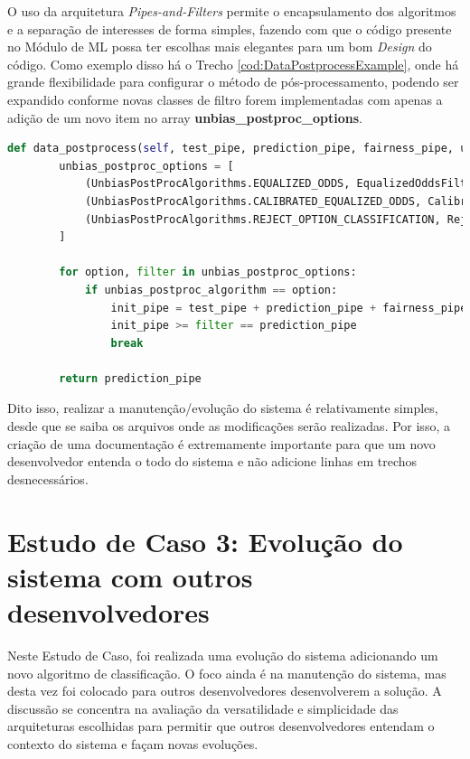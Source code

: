 \documentclass[portugues]{ic-tese}
\begin{document}
O uso da arquitetura \textit{Pipes-and-Filters} permite o encapsulamento dos algoritmos e a separação de interesses de forma simples, fazendo com que o código presente no Módulo de ML possa ter escolhas mais elegantes para um bom \textit{Design} do código. Como exemplo disso há o Trecho \ref{cod:DataPostprocessExample}, onde há grande flexibilidade para configurar o método de pós-processamento, podendo ser expandido conforme novas classes de filtro forem implementadas com apenas a adição de um novo item no array \textbf{unbias\_postproc\_options}.

\begin{lstlisting}[language=Python, caption=Método para seleção de algoritmo para redução de viés de pós-processamento,label=cod:DataPostprocessExample]
    def data_postprocess(self, test_pipe, prediction_pipe, fairness_pipe, unbias_postproc_algorithm):
        unbias_postproc_options = [
            (UnbiasPostProcAlgorithms.EQUALIZED_ODDS, EqualizedOddsFilter()),
            (UnbiasPostProcAlgorithms.CALIBRATED_EQUALIZED_ODDS, CalibratedEqualizedOddsFilter()),
            (UnbiasPostProcAlgorithms.REJECT_OPTION_CLASSIFICATION, RejectOptionClassificationFilter())
        ]

        for option, filter in unbias_postproc_options:
            if unbias_postproc_algorithm == option:
                init_pipe = test_pipe + prediction_pipe + fairness_pipe['unprivileged_group', 'privileged_group']
                init_pipe >= filter == prediction_pipe
                break

        return prediction_pipe
\end{lstlisting}

Dito isso, realizar a manutenção/evolução do sistema é relativamente simples, desde que se saiba os arquivos onde as modificações serão realizadas. Por isso, a criação de uma documentação é extremamente importante para que um novo desenvolvedor entenda o todo do sistema e não adicione linhas em trechos desnecessários.

\chapter{Estudo de Caso 3: Evolução do sistema com outros desenvolvedores}

Neste Estudo de Caso, foi realizada uma evolução do sistema adicionando um novo algoritmo de classificação. O foco ainda é na manutenção do sistema, mas desta vez foi colocado para outros desenvolvedores desenvolverem a solução. A discussão se concentra na avaliação da versatilidade e simplicidade das arquiteturas escolhidas para permitir que outros desenvolvedores entendam o contexto do sistema e façam novas evoluções.
\end{document}
